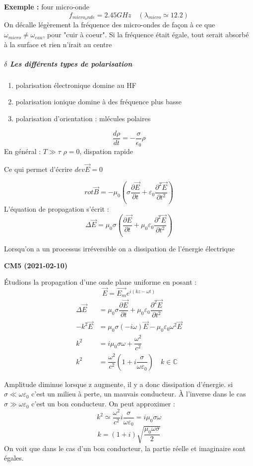 \documentclass[12pt,a4paper]{report}
\newcommand{\ens}[1]{\mathbb{#1}}
\begin{document}
\textbf{Exemple :} four micro-onde
\[
	f_{micro_onde} = 2.45GHz \quad	(\lambda_{micro} \simeq 12.2)
\]
On décalle légèrement la fréquence des micro-ondes de façon à ce que \(\omega_{micro} \neq \omega_{eau}\), pour "cuir à coeur". Si la fréquence était égale, tout serait absorbé à la surface et rien n'irait au centre

\subparagraph{$\delta$ Les différents types de polarisation}

\begin{enumerate}
	\item polarisation électronique domine au HF
	\item polarisation ionique domine à des fréquence plus basse
	\item polarisation d'orientation : mlécules polaires
\end{enumerate}

\[
	\dfrac{d\rho}{dt} = -\dfrac{\sigma}{\epsilon_0}\rho
\]
En général : \(T \gg \tau\)
\(\rho = 0\), dispation rapide

Ce qui permet d'écrire \(dev\vec{E} = 0\)

\[
	rot \vec{B} = -\mu_0 \left( \sigma \dfrac{\partial \vec{E}}{\partial t} + \varepsilon_0 \dfrac{\partial^2 \vec{E}}{\partial t^2}\right)
\]
L'équation de propagation s'écrit :
\[
	\Delta \vec{E} = \mu_0 \sigma \left( \dfrac{\partial \vec{E}}{\partial t} + \mu_0\varepsilon_0 \dfrac{\partial^2 \vec{E}}{\partial t^2}\right)
\]

Lorsqu'on a un processus irréversible on a dissipation de l'énergie électrique

\begin{center}
\textbf{CM5 (2021-02-10)}
\end{center}

Étudions la propagation d'une onde plane uniforme en posant :
\[
	\vec{E} = \vec{E_m} e^{i(kz-\omega t)}
\]
\begin{align*}
	\Delta \vec{E} &= \mu_0 \sigma  \dfrac{\partial \vec{E}}{\partial t} + \mu_0 \varepsilon_0 \dfrac{\partial^2 \vec{E}}{\partial t^2}\\
	-k^2 \vec{E} &= \mu_0 \sigma (-i\omega) \vec{E} - \mu_0 \varepsilon_0 \omega^2 \vec{E}\\
	k^2 &= i\mu_0 \sigma \omega + \dfrac{\omega^2}{c^2}\\
	k^2 &= \dfrac{\omega^2}{c^2} \left( 1 + i\dfrac{\sigma}{\omega \varepsilon_0}\right) \quad
	k \in \ens{C}
\end{align*}

Amplitude diminue lorsque z augmente, il y a donc dissipation d'énergie. si \(\sigma \ll \omega \varepsilon_0\) c'est un milieu à perte, un mauvais conducteur.
À l'inverse dans le cas \(\sigma \gg \omega \varepsilon_0\) c'est un bon conducteur.
On peut approximer :
\[
	k^2 \simeq \dfrac{\omega^2}{c^2} i\dfrac{\sigma}{\omega \varepsilon_0} = i\mu_0 \sigma \omega
\]
\[
	k = (1+i) \sqrt{\dfrac{\mu_0 \omega \sigma}{2}}
\]
On voit que dans le cas d'un bon conducteur, la partie réelle et imaginaire sont égales.
\end{document}
